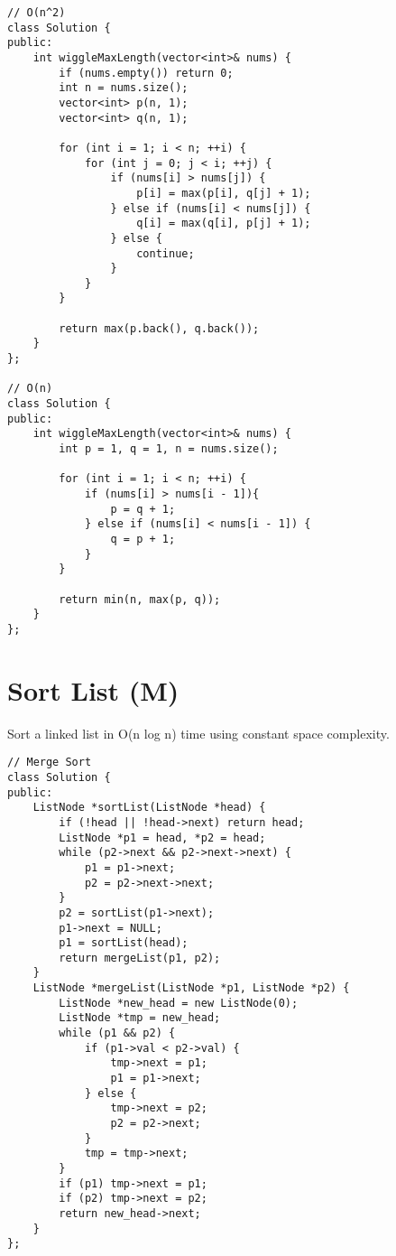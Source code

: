 \begin{lstlisting}
// O(n^2)
class Solution {
public:
    int wiggleMaxLength(vector<int>& nums) {
        if (nums.empty()) return 0;
        int n = nums.size();
        vector<int> p(n, 1);
        vector<int> q(n, 1);
        
        for (int i = 1; i < n; ++i) {
            for (int j = 0; j < i; ++j) {
                if (nums[i] > nums[j]) {
                    p[i] = max(p[i], q[j] + 1);
                } else if (nums[i] < nums[j]) {
                    q[i] = max(q[i], p[j] + 1);
                } else {
                    continue;
                }
            }
        }
        
        return max(p.back(), q.back());
    }
};

// O(n)
class Solution {
public:
    int wiggleMaxLength(vector<int>& nums) {
        int p = 1, q = 1, n = nums.size();
        
        for (int i = 1; i < n; ++i) {
            if (nums[i] > nums[i - 1]){ 
                p = q + 1;
            } else if (nums[i] < nums[i - 1]) {
                q = p + 1;
            }
        }
        
        return min(n, max(p, q));
    }
};
\end{lstlisting}


\section{Sort List (M)}
Sort a linked list in O(n log n) time using constant space complexity.\\

\begin{lstlisting}
// Merge Sort
class Solution {
public:
    ListNode *sortList(ListNode *head) {
        if (!head || !head->next) return head;
        ListNode *p1 = head, *p2 = head;
        while (p2->next && p2->next->next) {
            p1 = p1->next;
            p2 = p2->next->next;
        }
        p2 = sortList(p1->next);
        p1->next = NULL;
        p1 = sortList(head);
        return mergeList(p1, p2);
    }
    ListNode *mergeList(ListNode *p1, ListNode *p2) {
        ListNode *new_head = new ListNode(0);
        ListNode *tmp = new_head;
        while (p1 && p2) {
            if (p1->val < p2->val) {
                tmp->next = p1;
                p1 = p1->next;
            } else {
                tmp->next = p2;
                p2 = p2->next;
            }
            tmp = tmp->next;
        }
        if (p1) tmp->next = p1;
        if (p2) tmp->next = p2;
        return new_head->next;
    }
};
\end{lstlisting}


